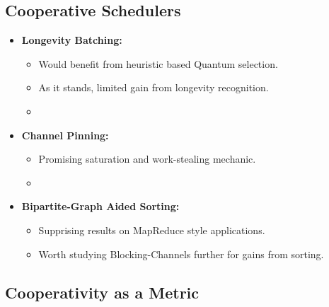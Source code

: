 \subsection{Cooperative Schedulers}

\begin{slide}
    \begin{itemize}
        \item {\bf Longevity Batching:}
            \begin{itemize}
                \item Would benefit from heuristic based Quantum selection.
                \item As it stands, limited gain from longevity recognition.
                \item[] ~
            \end{itemize} 
        \item {\bf Channel Pinning:}
            \begin{itemize}
                \item Promising saturation and work-stealing mechanic.
                \item[] ~
            \end{itemize}
        \item {\bf Bipartite-Graph Aided Sorting:} 
            \begin{itemize}
                \item Supprising results on MapReduce style applications.
                \item Worth studying Blocking-Channels further for gains from 
                    sorting.
            \end{itemize}
    \end{itemize}

\end{slide}

\subsection{Cooperativity as a Metric}


